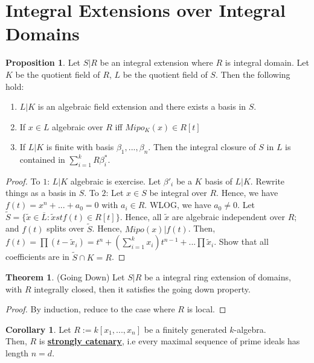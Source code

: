 \documentclass{article}
\theoremstyle{definition}
\newtheorem{theorem}{Theorem}[section]
\theoremstyle{definition}
\theoremstyle{definition}
\newtheorem{proposition}{Proposition}[section]
\theoremstyle{definition}
\theoremstyle{definition}
\theoremstyle{definition}
\newtheorem{corollary}{Corollary}[theorem]
\theoremstyle{definition}
\begin{document}
\section{Integral Extensions over Integral Domains}

\begin{tcolorbox}[colback=blue!5!white,colframe=blue!30!white]
\begin{proposition}
Let $S|R$ be an integral extension where $R$ is integral domain. Let $K$ be the quotient field of $R$, $L$ be the quotient field of $S$. Then the following hold:
\begin{enumerate}
    \item $L|K$ is an algebraic field extension and there exists a basis in $S$. 
    \item If $x\in L$ algebraic over $R$ iff $Mipo_K(x)\in R[t]$
    \item If $L|K$ is finite with basis $\beta_1,...,\beta_n$. Then the integral closure of $S$ in $L$ is contained in $\sum_{i=1}^{k} R\beta^*_i$. 
\end{enumerate} 
\end{proposition}
\end{tcolorbox}
\begin{proof}
    To $1$: $L|K$ algebraic is exercise.  Let $\beta'_i$ be a $K$ basis of $L|K$. Rewrite things as a basis in $S$. 
    To $2$: Let $x\in S$ be integral over $R$. Hence, we have $f(t)=x^n+...+a_0=0$ with $a_i\in R$. WLOG, we have $a_0\neq 0$. Let $\tilde{S}=\{ \tilde{x}\in \overline{L}: \tilde{x} st f(t)\in R[t] \}$. Hence, all $\tilde{x}$ are algebraic independent over $R$; and $f(t)$ splits over $\tilde{S}$. Hence, $Mipo(x)|f(t)$. Then, $f(t)=\prod (t-\tilde{x}_i)=t^n+(\sum_{i=1}^{k}x_i)t^{n-1}+...\prod \tilde{x}_i$. Show that all coefficients are in $\tilde{S}\cap K=R$. 
\end{proof}


\begin{tcolorbox}[colback=red!5!white,colframe=red!30!white]
\begin{theorem}
(Going Down) Let $S|R$ be a integral ring extension of domains, with $R$ integrally closed, then it satisfies the going down property.
\end{theorem}
\end{tcolorbox}
\begin{proof}
    By induction, reduce to the case where $R$ is local. 
\end{proof}

\begin{tcolorbox}[colback=green!5!white,colframe=green!30!white]
    \begin{corollary}
        Let $R:=k[x_1,...,x_n]$ be a finitely generated $k$-algebra. \\
        Then, $R$ is \underline{\textbf{strongly catenary}}, i.e every maximal sequence of prime ideals has length $n=d$. 
    \end{corollary}
    \end{tcolorbox}
\end{document}
